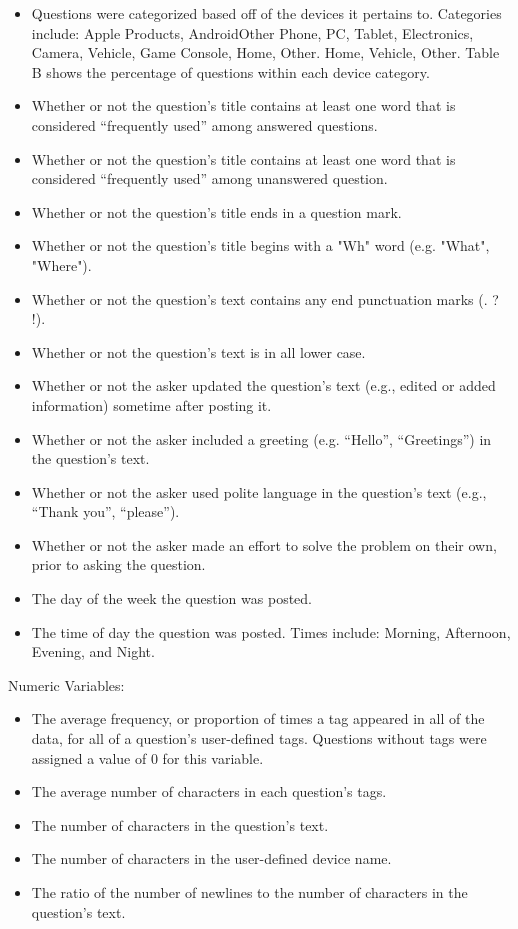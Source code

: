 \documentclass[12pt]{article}
\begin{document}
\begin{itemize}
  \item Questions were categorized based off of the devices it pertains to. Categories include: Apple Products, Android\/Other Phone, PC, Tablet, Electronics, Camera, Vehicle, Game Console, Home, Other. Home, Vehicle, Other. Table B shows the percentage of questions within each device category. 
  \item Whether or not the question's title contains at least one word that is considered ``frequently used'' among answered questions.
  \item Whether or not the question's title contains at least one word that is considered ``frequently used'' among unanswered question. 
  \item Whether or not the question's title ends in a question mark.
  \item Whether or not the question's title begins with a "Wh" word (e.g. "What", "Where"). 
  \item Whether or not the question's text contains any end punctuation marks (. ? !). 
  \item Whether or not the question's text is in all lower case. 
  \item Whether or not the asker updated the question's text (e.g., edited or added information) sometime after posting it. 
  \item Whether or not the asker included a greeting (e.g. ``Hello'', ``Greetings'') in the question's text.
  \item Whether or not the asker used polite language in the question's text (e.g., ``Thank you'', ``please''). 
  \item Whether or not the asker made an effort to solve the problem on their own, prior to asking the question.
  \item The day of the week the question was posted. 
  \item The time of day the question was posted. Times include: Morning, Afternoon, Evening, and Night. 
\end{itemize}

Numeric Variables:

\begin{itemize}
  \item The average frequency, or proportion of times a tag appeared in all of the data, for all of a question's user-defined tags. Questions without tags were assigned a value of 0 for this variable. 
  \item The average number of characters in each question's tags. 
  \item The number of characters in the question's text. 
  \item The number of characters in the user-defined device name. 
  \item The ratio of the number of newlines to the number of characters in the question's text.
\end{itemize}
\end{document}
